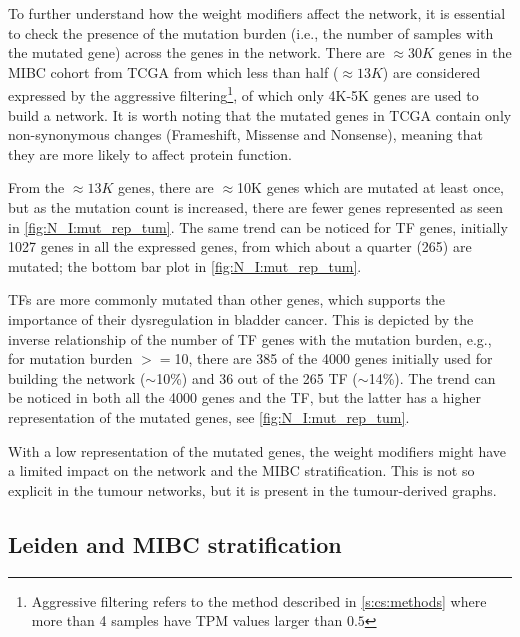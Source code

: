 To further understand how the weight modifiers affect the network, it is essential to check the presence of the mutation burden (i.e., the number of samples with the mutated gene) across the genes in the network. There are $\approx30K$ genes in the MIBC cohort from TCGA from which less than half ($\approx13K$) are considered expressed by the aggressive filtering\footnote{Aggressive filtering refers to the method described in \cref{s:cs:methods} where more than 4 samples have TPM values larger than $0.5$}, of which only 4K-5K genes are used to build a network. It is worth noting that the mutated genes in TCGA contain only non-synonymous changes (Frameshift, Missense and Nonsense), meaning that they are more likely to affect protein function.

From the $\approx13K$ genes, there are $\approx$10K genes which are mutated at least once, but as the mutation count is increased, there are fewer genes represented as seen in \cref{fig:N_I:mut_rep_tum}. The same trend can be noticed for TF genes, initially 1027 genes in all the expressed genes, from which about a quarter (265) are mutated; the bottom bar plot in \cref{fig:N_I:mut_rep_tum}.

TFs are more commonly mutated than other genes, which supports the importance of their dysregulation in bladder cancer. This is depicted by the inverse relationship of the number of TF genes with the mutation burden, e.g., for mutation burden $>=$10, there are 385 of the 4000 genes initially used for building the network ($\sim$10\%) and 36 out of the 265 TF ($\sim$14\%). The trend can be noticed in both all the 4000 genes and the TF, but the latter has a higher representation of the mutated genes, see \cref{fig:N_I:mut_rep_tum}. 

With a low representation of the mutated genes, the weight modifiers might have a limited impact on the network and the MIBC stratification. This is not so explicit in the tumour networks, but it is present in the tumour-derived graphs.


\subsection{Leiden and MIBC stratification} \label{s:N_I:tum_stratification}

